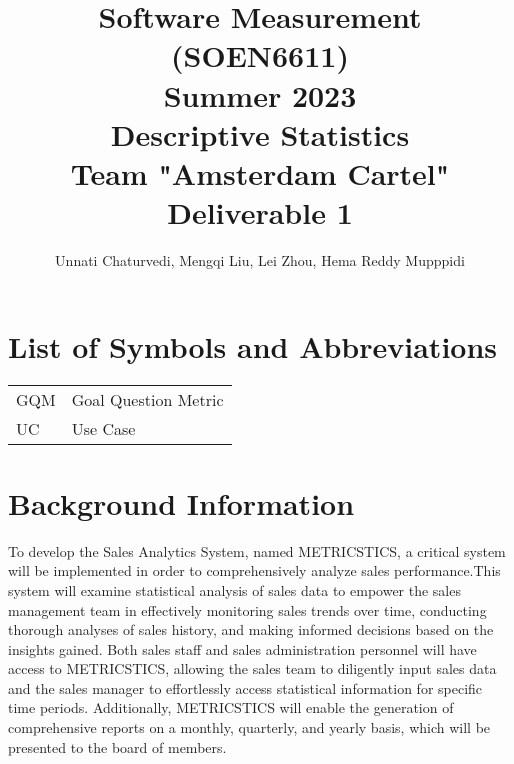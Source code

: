 \documentclass[12pt,letterpaper]{report}
\begin{document}
\title{Software Measurement (SOEN6611)\\[.5em]
Summer 2023\\[.5em]
Descriptive Statistics\\[.5em]
Team "Amsterdam Cartel"\\[.5em]
Deliverable 1}
\author{Unnati Chaturvedi, Mengqi Liu, Lei Zhou, Hema Reddy Mupppidi}
\maketitle

\setcounter{page}{0}

\tableofcontents

\chapter*{List of Symbols and Abbreviations}



\noindent\begin{tabular}{ll}
GQM & Goal Question Metric\\
UC & Use Case

\end{tabular}

\listoffigures{}


\chapter{Background Information}
To develop the Sales Analytics System, named METRICSTICS, a critical system will be implemented in order to comprehensively analyze sales performance.This system will examine statistical analysis of sales data to empower the sales management team in effectively monitoring sales trends over time, conducting thorough analyses of sales history, and making informed decisions based on the insights gained. Both sales staff and sales administration personnel will have access to METRICSTICS, allowing the sales team to diligently input sales data and the sales manager to effortlessly access statistical information for specific time periods. Additionally, METRICSTICS will enable the generation of comprehensive reports on a monthly, quarterly, and yearly basis, which will be presented to the board of members.		 	 	 	
\end{document}
